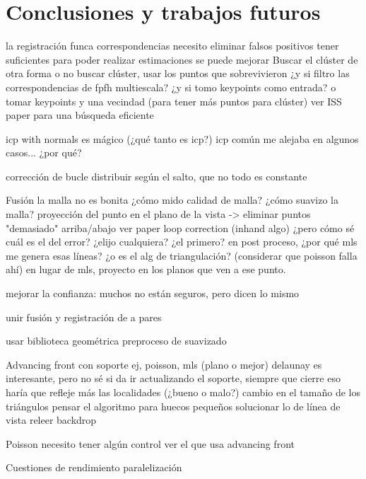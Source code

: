 \chapter*{Conclusiones y trabajos futuros}
la registración funca
	correspondencias
		necesito eliminar falsos positivos
		tener suficientes para poder realizar estimaciones
	se puede mejorar
		Buscar el clúster de otra forma 
			o no buscar clúster, usar los puntos que sobrevivieron
		¿y si filtro las correspondencias de fpfh multiescala?
		¿y si tomo keypoints como entrada?
		o tomar keypoints y una vecindad (para tener más puntos para clúster)
		ver ISS paper para una búsqueda eficiente

	icp with normals es mágico (¿qué tanto es icp?)
		icp común me alejaba en algunos casos... ¿por qué?

	corrección de bucle
		distribuir según el salto, que no todo es constante

Fusión
	la malla no es bonita ¿cómo mido calidad de malla?
	¿cómo suavizo la malla?
	proyección del punto en el plano de la vista
		-> eliminar puntos "demasiado" arriba/abajo
			ver paper loop correction (inhand algo)
		¿pero cómo sé cuál es el del error? ¿elijo cualquiera? ¿el primero?
		en post proceso,
			¿por qué mls me genera esas líneas?
			¿o es el alg de triangulación? (considerar que poisson falla ahí)
			en lugar de mls, proyecto en los planos que ven a ese punto.

	mejorar la confianza:
		muchos no están seguros, pero dicen lo mismo

unir fusión y registración de a pares

usar biblioteca geométrica
	preproceso de suavizado

Advancing front con soporte
	ej, poisson, mls (plano o mejor)
		delaunay es interesante, pero no sé si da
	ir actualizando el soporte, siempre que cierre
		eso haría que refleje más las localidades (¿bueno o malo?)
	cambio en el tamaño de los triángulos 
	pensar el algoritmo para huecos pequeños
	solucionar lo de línea de vista
		releer backdrop

Poisson
	necesito tener algún control
	ver el que usa advancing front


Cuestiones de rendimiento
	paralelización

